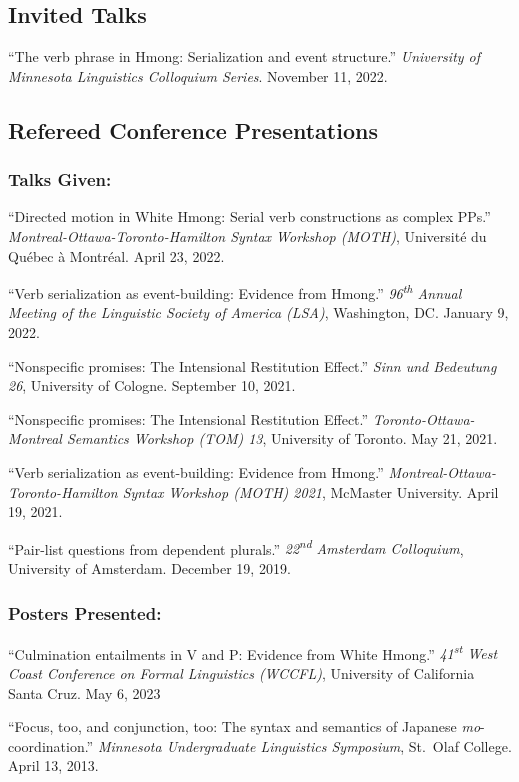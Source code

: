 \documentclass[11pt,oneside,DIV=9,parskip=off]{scrarticle} %
\newlength{\spacingbefore}
\newlength{\spacingafter}
\newcommand{\myonecol}[1]{%
	\vspace{\spacingbefore}%
	\begin{minipage}[t]{\linewidth}%
		\strut#1%
	\end{minipage}%
	\vspace{\spacingafter}\par%
	}
\newcommand{\talk}[1]{%
	\myonecol{#1}%
	}
\begin{document}
\subsection{Invited Talks}
\talk{``The verb phrase in Hmong: Serialization and event structure.'' \textit{University of Minnesota Linguistics Colloquium Series}. November 11, 2022.}


\subsection{Refereed Conference Presentations}
\subsubsection{Talks Given:}
\talk{``Directed motion in White Hmong: Serial verb constructions as complex PPs.'' \textit{Montreal-Ottawa-Toronto-Hamilton Syntax Workshop (MOTH)}, Universit\'e du Qu\'ebec \`a Montr\'eal. April 23, 2022.}
\talk{``Verb serialization as event-building: Evidence from Hmong.'' \textit{96\textsuperscript{th} Annual Meeting of the Linguistic Society of America (LSA)}, Washington, DC. January 9, 2022.}
\talk{``Nonspecific promises: The Intensional Restitution Effect.'' \textit{Sinn und Bedeutung 26}, University of Cologne. September 10, 2021.}
\talk{``Nonspecific promises: The Intensional Restitution Effect.'' \textit{Toronto-Ottawa-Montreal Semantics Workshop (TOM) 13}, University of Toronto. May 21, 2021.}
\talk{``Verb serialization as event-building: Evidence from Hmong.'' \textit{Montreal-Ottawa-Toronto-Hamilton Syntax Workshop (MOTH) 2021}, McMaster University. April 19, 2021.}
\talk{``Pair-list questions from dependent plurals.'' \textit{22\textsuperscript{nd} Amsterdam Colloquium}, University of Amsterdam. December 19, 2019.}

\subsubsection{Posters Presented:}
\talk{``Culmination entailments in V and P: Evidence from White Hmong.'' \textit{41\textsuperscript{st} West Coast Conference on Formal Linguistics (WCCFL)}, University of California Santa Cruz. May 6, 2023}
\talk{``Focus, too, and conjunction, too: The syntax and semantics of Japanese \textit{mo}-coordination.'' \textit{Minnesota Undergraduate Linguistics Symposium}, St.\ Olaf College. April 13, 2013.}
\end{document}
